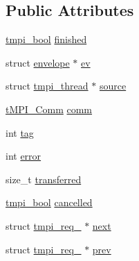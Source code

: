 \subsection*{\-Public \-Attributes}
\begin{DoxyCompactItemize}
\item 
\hyperlink{impl_8h_a1c904605658586a00645b5fc9f6b8479}{tmpi\-\_\-bool} \hyperlink{structtmpi__req___ad3508dc1223626c8722259f45dcaa83c}{finished}
\item 
struct \hyperlink{structenvelope}{envelope} $\ast$ \hyperlink{structtmpi__req___abe148223628e06f0cfde20b1cdd0e4cf}{ev}
\item 
struct \hyperlink{structtmpi__thread}{tmpi\-\_\-thread} $\ast$ \hyperlink{structtmpi__req___a66d282f8204b27bd11dde5655ba893bc}{source}
\item 
\hyperlink{include_2thread__mpi_2tmpi_8h_ab76dc275b882a1d00a54353fb8dd4cb3}{t\-M\-P\-I\-\_\-\-Comm} \hyperlink{structtmpi__req___a30e27fd4400356a1ff6575ca72d1a989}{comm}
\item 
int \hyperlink{structtmpi__req___ad284068d6ea75f3fc069fb1a61d745a3}{tag}
\item 
int \hyperlink{structtmpi__req___ae23dbe23252a96d9c8d862a028ad84d0}{error}
\item 
size\-\_\-t \hyperlink{structtmpi__req___a479f9873547441132de60a7c45f84691}{transferred}
\item 
\hyperlink{impl_8h_a1c904605658586a00645b5fc9f6b8479}{tmpi\-\_\-bool} \hyperlink{structtmpi__req___a94bb550b9907219a52decbd9ba700e88}{cancelled}
\item 
struct \hyperlink{structtmpi__req__}{tmpi\-\_\-req\-\_\-} $\ast$ \hyperlink{structtmpi__req___a9ddc799259f35f19bd76dc93d87520f6}{next}
\item 
struct \hyperlink{structtmpi__req__}{tmpi\-\_\-req\-\_\-} $\ast$ \hyperlink{structtmpi__req___a4b63333c8d9b3089190e830b2ca80709}{prev}
\end{DoxyCompactItemize}


